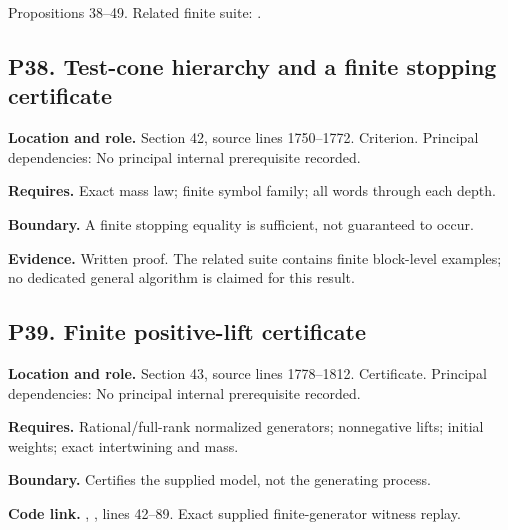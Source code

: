 \documentclass[11pt,letterpaper]{article}
\begin{document}
Propositions 38--49. Related finite suite:
.

\par\noindent\begin{minipage}{\textwidth}
\subsection{P38. Test-cone hierarchy and a finite stopping
certificate}\label{p38.-test-cone-hierarchy-and-a-finite-stopping-certificate}

\textbf{Location and role.} Section 42, source lines 1750--1772.
Criterion. Principal dependencies: No principal internal prerequisite
recorded.

\textbf{Requires.} Exact mass law; finite symbol family; all words
through each depth.

\textbf{Boundary.} A finite stopping equality is sufficient, not
guaranteed to occur.

\textbf{Evidence.} Written proof. The related suite contains finite
block-level examples; no dedicated general algorithm is claimed for this
result.
\end{minipage}\par\medskip

\par\noindent\begin{minipage}{\textwidth}
\subsection{P39. Finite positive-lift
certificate}\label{p39.-finite-positive-lift-certificate}

\textbf{Location and role.} Section 43, source lines 1778--1812.
Certificate. Principal dependencies: No principal internal prerequisite
recorded.

\textbf{Requires.} Rational/full-rank normalized generators; nonnegative
lifts; initial weights; exact intertwining and mass.

\textbf{Boundary.} Certifies the supplied model, not the generating
process.

\textbf{Code link.} ,
, lines 42--89. Exact supplied
finite-generator witness replay.
\end{minipage}\par\medskip
\end{document}
